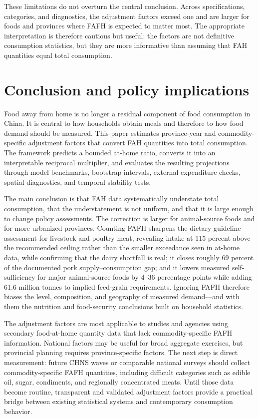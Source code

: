\documentclass[preprint,12pt,authoryear]{elsarticle}
\begin{document}
These limitations do not overturn the central conclusion. Across specifications, categories, and diagnostics, the adjustment factors exceed one and are larger for foods and provinces where FAFH is expected to matter most. The appropriate interpretation is therefore cautious but useful: the factors are not definitive consumption statistics, but they are more informative than assuming that FAH quantities equal total consumption.

\section{Conclusion and policy implications}
\label{sec:conclusion}

Food away from home is no longer a residual component of food consumption in China. It is central to how households obtain meals and therefore to how food demand should be measured. This paper estimates province-year and commodity-specific adjustment factors that convert FAH quantities into total consumption. The framework predicts a bounded at-home ratio, converts it into an interpretable reciprocal multiplier, and evaluates the resulting projections through model benchmarks, bootstrap intervals, external expenditure checks, spatial diagnostics, and temporal stability tests.

The main conclusion is that FAH data systematically understate total consumption, that the understatement is not uniform, and that it is large enough to change policy assessments. The correction is larger for animal-source foods and for more urbanized provinces. Counting FAFH sharpens the dietary-guideline assessment for livestock and poultry meat, revealing intake at 115 percent above the recommended ceiling rather than the smaller exceedance seen in at-home data, while confirming that the dairy shortfall is real; it closes roughly 69 percent of the documented pork supply--consumption gap; and it lowers measured self-sufficiency for major animal-source foods by 4--36 percentage points while adding 61.6 million tonnes to implied feed-grain requirements. Ignoring FAFH therefore biases the level, composition, and geography of measured demand---and with them the nutrition and food-security conclusions built on household statistics.

The adjustment factors are most applicable to studies and agencies using secondary food-at-home quantity data that lack commodity-specific FAFH information. National factors may be useful for broad aggregate exercises, but provincial planning requires province-specific factors. The next step is direct measurement: future CHNS waves or comparable national surveys should collect commodity-specific FAFH quantities, including difficult categories such as edible oil, sugar, condiments, and regionally concentrated meats. Until those data become routine, transparent and validated adjustment factors provide a practical bridge between existing statistical systems and contemporary consumption behavior.
\end{document}
